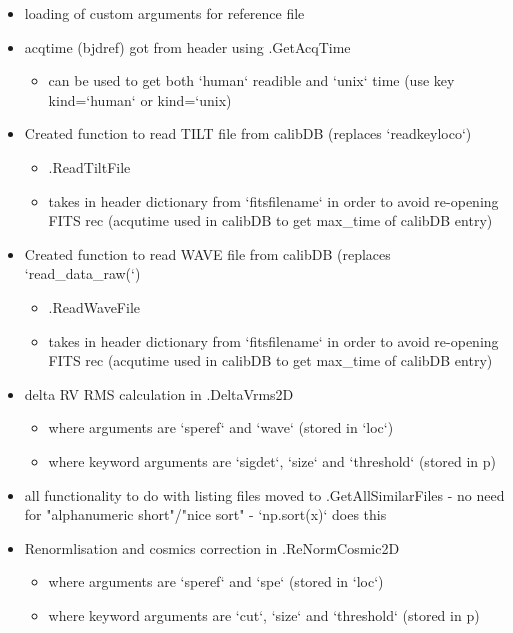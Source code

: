 \begin{itemize}
\item loading of custom arguments for reference file

\item acqtime (bjdref) got from header using \spirouImage.GetAcqTime
	\begin{itemize}
	\item can be used to get both `human` readible and `unix` time (use key kind=`human` or kind=`unix)
	\end{itemize}

\item Created function to read TILT file from calibDB (replaces `readkeyloco`)
	\begin{itemize}
	\item \spirouImage.ReadTiltFile
	\item takes in header dictionary from `fitsfilename` in order to avoid re-opening FITS rec (acqutime used in calibDB to get max\_time of calibDB entry) 
	\end{itemize}

\item Created function to read WAVE file from calibDB (replaces `read\_data\_raw(`)
	\begin{itemize}
	\item \spirouImage.ReadWaveFile
	\item takes in header dictionary from `fitsfilename` in order to avoid re-opening FITS rec (acqutime used in calibDB to get max\_time of calibDB entry) 
	\end{itemize}

\item delta RV RMS calculation in \spirouRV.DeltaVrms2D
	\begin{itemize}
	\item where arguments are `speref` and `wave` (stored in `loc`)
	\item where keyword arguments are `sigdet`, `size` and `threshold` (stored in p)
	\end{itemize}

\item all functionality to do with listing files moved to \spirouImage{\hskip 0pt}.GetAllSimilarFiles - no need for "alphanumeric short"/"nice sort" - `np.sort(x)` does this
    
\item Renormlisation and cosmics correction in \spirouRV.ReNormCosmic2D
	\begin{itemize}
	\item where arguments are `speref` and `spe` (stored in `loc`)
	\item where keyword arguments are `cut`, `size` and `threshold` (stored in p)
	\end{itemize}


\end{itemize}
